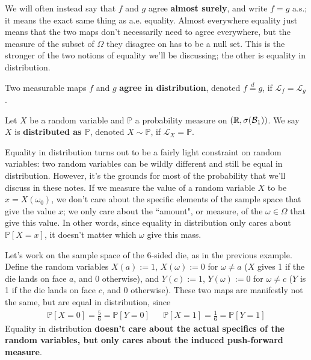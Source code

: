 We will often instead say that $f$ and $g$ agree \textbf{almost surely}, and write $f = g$ a.s.; it means the exact same thing as a.e. equality. Almost everywhere equality just means that the two maps don't necessarily need to agree everywhere, but the measure of the subset of $\Omega$ they disagree on has to be a null set. This is the stronger of the two notions of equality we'll be discussing; the other is equality in distribution. 

\begin{definition}
	Two measurable maps $f$ and $g$ \textbf{agree in distribution}, denoted $f \overset{d}{=} g$, if $\mathcal L_f = \mathcal L_g$.
\end{definition}

\begin{definition}[Distributed as]
	Let $X$ be a random variable and $\mathbb P$ a probability measure on $(\mathbb R, \sigma(\mathcal{B}_{1}))$. We say $X$ is \textbf{distributed as $\mathbb P$}, denoted $X\sim\mathbb P$, if $\mathcal L_X = \mathbb P$. 
\end{definition}

\begin{example}
	Equality in distribution turns out to be a fairly light constraint on random variables: two random variables can be wildly different and still be equal in distribution. However, it's the grounds for most of the probability that we'll discuss in these notes. If we measure the value of a random variable $X$ to be $x = X(\omega_0)$, we don't care about the specific elements of the sample space that give the value $x$; we only care about the ``amount", or measure, of the $\omega\in\Omega$ that give this value. In other words, since equality in distribution only cares about $\mathbb P[X = x]$, it doesn't matter which $\omega$ give this mass. 
	
	Let's work on the sample space of the 6-sided die, as in the previous example. Define the random variables $X(a) := 1$, $X(\omega) := 0$ for $\omega\neq a$ ($X$ gives 1 if the die lands on face $a$, and 0 otherwise), and $Y(c) := 1$, $Y(\omega) := 0$ for $\omega\neq c$ ($Y$ is 1 if the die lands on face $c$, and 0 otherwise). These two maps are manifestly not the same, but are equal in distribution, since
	\begin{align}
		\mathbb P[X = 0] = \frac{5}{6} = \mathbb P[Y = 0] && \mathbb P[X = 1] = \frac{1}{6} = \mathbb P[Y = 1]
	\end{align}
	Equality in distribution \textbf{doesn't care about the actual specifics of the random variables, but only cares about the induced push-forward measure}. 
\end{example}


